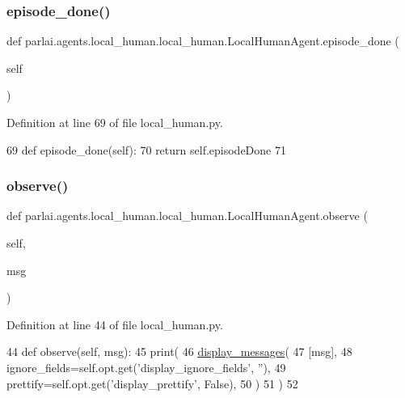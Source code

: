 \subsubsection{\texorpdfstring{episode\+\_\+done()}{episode\_done()}}
{\footnotesize\ttfamily def parlai.\+agents.\+local\+\_\+human.\+local\+\_\+human.\+Local\+Human\+Agent.\+episode\+\_\+done (\begin{DoxyParamCaption}\item[{}]{self }\end{DoxyParamCaption})}



Definition at line 69 of file local\+\_\+human.\+py.


\begin{DoxyCode}
69     \textcolor{keyword}{def }episode\_done(self):
70         \textcolor{keywordflow}{return} self.episodeDone
71 \end{DoxyCode}
\mbox{\label{classparlai_1_1agents_1_1local__human_1_1local__human_1_1LocalHumanAgent_aa204d28672d6580895d95aed167cb129}} 
\subsubsection{\texorpdfstring{observe()}{observe()}}
{\footnotesize\ttfamily def parlai.\+agents.\+local\+\_\+human.\+local\+\_\+human.\+Local\+Human\+Agent.\+observe (\begin{DoxyParamCaption}\item[{}]{self,  }\item[{}]{msg }\end{DoxyParamCaption})}



Definition at line 44 of file local\+\_\+human.\+py.


\begin{DoxyCode}
44     \textcolor{keyword}{def }observe(self, msg):
45         print(
46             \hyperlink{namespaceparlai_1_1utils_1_1misc_a7c86f996f4b55a960da46c1142a2c507}{display\_messages}(
47                 [msg],
48                 ignore\_fields=self.opt.get(\textcolor{stringliteral}{'display\_ignore\_fields'}, \textcolor{stringliteral}{''}),
49                 prettify=self.opt.get(\textcolor{stringliteral}{'display\_prettify'}, \textcolor{keyword}{False}),
50             )
51         )
52 
\end{DoxyCode}


